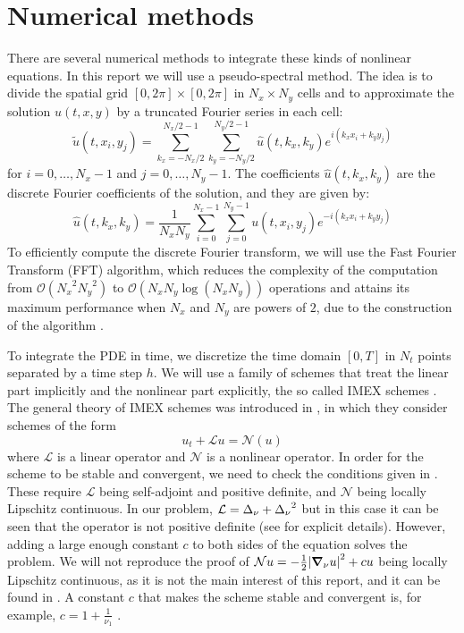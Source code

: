 \documentclass[twoside]{article}
\begin{document}
\section{Numerical methods}

There are several numerical methods to integrate these kinds of nonlinear equations. In this report we will use a pseudo-spectral method. The idea is to divide the spatial grid $[0,2\pi]\times [0,2\pi]$ in $N_x \times N_y$ cells and to approximate the solution $u(t,x,y)$ by a truncated Fourier series in each cell:
\begin{equation}\label{eq:idft}
  \tilde{u}(t,x_i,y_j) = \sum_{k_x=-N_x/2}^{N_x/2-1} \sum_{k_y=-N_y/2}^{N_y/2-1} \hat{u}(t,k_x,k_y) e^{i(k_x x_i + k_y y_j)}
\end{equation}
for $i=0,\dots,N_x-1$ and $j=0,\dots,N_y-1$. The coefficients $\hat{u}(t,k_x,k_y)$ are the discrete Fourier coefficients of the solution, and they are given by:
\begin{equation}\label{eq:dft}
  \hat{u}(t,k_x,k_y) = \frac{1}{N_x N_y} \sum_{i=0}^{N_x-1} \sum_{j=0}^{N_y-1} u(t,x_i,y_j) e^{-i(k_x x_i + k_y y_j)}
\end{equation}
To efficiently compute the discrete Fourier transform, we will use the Fast Fourier Transform (FFT) algorithm, which reduces the complexity of the computation from $\mathcal{O}({N_x}^2 {N_y}^2)$ to $\mathcal{O}(N_x N_y \log(N_x N_y))$ operations and attains its maximum performance when $N_x$ and $N_y$ are powers of $2$, due to the construction of the algorithm \cite{fft}.

To integrate the PDE in time, we discretize the time domain $[0,T]$ in $N_t$ points separated by a time step $h$. We will use a family of schemes that treat the linear part implicitly and the nonlinear part explicitly, the so called IMEX schemes \cite{Akrivis_kuramoto}. The general theory of IMEX schemes was introduced in \cite{Akrivis2004}, in which they consider schemes of the form
\begin{equation}\label{eq:nonlinear_pde}
  u_t+\mathcal{L}u=\mathcal{N}(u)
\end{equation}
where $\mathcal{L}$ is a linear operator and $\mathcal{N}$ is a nonlinear operator. In order for the scheme to be stable and convergent, we need to check the conditions given in \cite{Akrivis2004}. These require $\mathcal{L}$ being self-adjoint and positive definite, and $\mathcal{N}$ being locally Lipschitz continuous. In our problem, $\mathcal{L}=\Delta_\nu + {\Delta_\nu}^2$ but in this case it can be seen that the operator is not positive definite (see \cite{phdthesis_anna} for explicit details). However, adding a large enough constant $c$ to both sides of the equation solves the problem. We will not reproduce the proof of $\mathcal{N}u=-\frac{1}{2} \abs{\grad_\nu u}^2 + cu$ being locally Lipschitz continuous, as it is not the main interest of this report, and it can be found in \cite{Akrivis_kuramoto}. A constant $c$ that makes the scheme stable and convergent is, for example, $c=1+\frac{1}{\nu_1}$ \cite{phdthesis_anna}.
\end{document}
